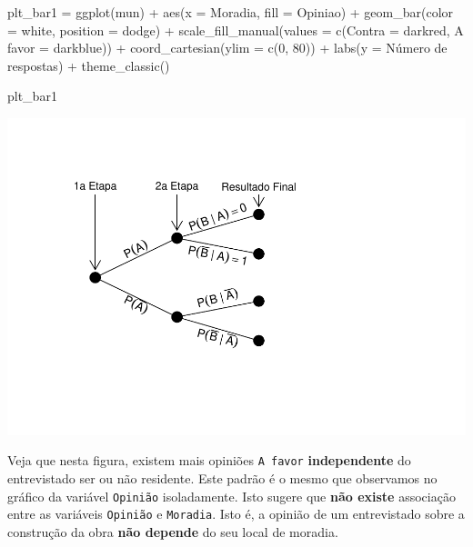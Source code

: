 \documentclass[
]{book}
\newenvironment{Shaded}{\begin{snugshade}}{\end{snugshade}}
\newcommand{\AttributeTok}[1]{\textcolor[rgb]{0.77,0.63,0.00}{#1}}
\newcommand{\DecValTok}[1]{\textcolor[rgb]{0.00,0.00,0.81}{#1}}
\newcommand{\FunctionTok}[1]{\textcolor[rgb]{0.00,0.00,0.00}{#1}}
\newcommand{\NormalTok}[1]{#1}
\newcommand{\OtherTok}[1]{\textcolor[rgb]{0.56,0.35,0.01}{#1}}
\newcommand{\SpecialCharTok}[1]{\textcolor[rgb]{0.00,0.00,0.00}{#1}}
\newcommand{\StringTok}[1]{\textcolor[rgb]{0.31,0.60,0.02}{#1}}
\begin{document}
\begin{Shaded}
\begin{Highlighting}[]
\NormalTok{plt\_bar1 }\OtherTok{=} \FunctionTok{ggplot}\NormalTok{(mun) }\SpecialCharTok{+}
  \FunctionTok{aes}\NormalTok{(}\AttributeTok{x =}\NormalTok{ Moradia, }\AttributeTok{fill =}\NormalTok{ Opiniao) }\SpecialCharTok{+}
  \FunctionTok{geom\_bar}\NormalTok{(}\AttributeTok{color =} \StringTok{\textquotesingle{}white\textquotesingle{}}\NormalTok{, }\AttributeTok{position =} \StringTok{\textquotesingle{}dodge\textquotesingle{}}\NormalTok{) }\SpecialCharTok{+}
  \FunctionTok{scale\_fill\_manual}\NormalTok{(}\AttributeTok{values =} \FunctionTok{c}\NormalTok{(}\StringTok{\textquotesingle{}Contra\textquotesingle{}} \OtherTok{=} \StringTok{\textquotesingle{}darkred\textquotesingle{}}\NormalTok{,}
                               \StringTok{\textquotesingle{}A favor\textquotesingle{}} \OtherTok{=} \StringTok{\textquotesingle{}darkblue\textquotesingle{}}\NormalTok{)) }\SpecialCharTok{+}
  \FunctionTok{coord\_cartesian}\NormalTok{(}\AttributeTok{ylim =} \FunctionTok{c}\NormalTok{(}\DecValTok{0}\NormalTok{, }\DecValTok{80}\NormalTok{)) }\SpecialCharTok{+}
  \FunctionTok{labs}\NormalTok{(}\AttributeTok{y =} \StringTok{\textquotesingle{}Número de respostas\textquotesingle{}}\NormalTok{) }\SpecialCharTok{+}
  \FunctionTok{theme\_classic}\NormalTok{()}

\NormalTok{plt\_bar1}
\end{Highlighting}
\end{Shaded}

\includegraphics{probest-cambientais_files/figure-latex/unnamed-chunk-189-1.pdf}

Veja que nesta figura, existem mais opiniões \texttt{A\ favor} \textbf{independente} do entrevistado ser ou não residente. Este padrão é o mesmo que observamos no gráfico da variável \texttt{Opinião} isoladamente. Isto sugere que \textbf{não existe} associação entre as variáveis \texttt{Opinião} e \texttt{Moradia}. Isto é, a opinião de um entrevistado sobre a construção da obra \textbf{não depende} do seu local de moradia.
\end{document}
